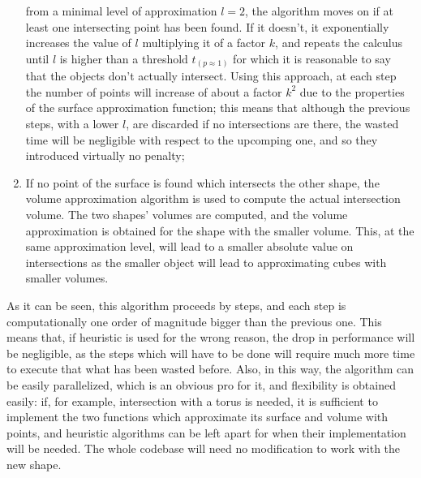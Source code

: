 \begin{enumerate}
{    from a minimal level of approximation  $l=2$, the algorithm moves
    on if at least one intersecting point has been found. If it
    doesn't, it exponentially increases the value of $l$ multiplying
    it of a factor $k$, and repeats
    the calculus until $l$ is higher than a threshold
    $t_{(p\approx 1)}$ for which it is reasonable to say that the
    objects don't actually intersect. Using this approach, at each
    step the number of points will increase of about a factor $k^2$
    due to the properties of the surface approximation function; this
    means that although the previous steps, with a lower $l$, are
    discarded if no intersections are there, the wasted time will be
    negligible with respect to the upcomping one, and so they introduced virtually no penalty;}
  \item{If no point of the surface is found which intersects the other
    shape, the volume approximation algorithm is used to compute the
    actual intersection volume. The two shapes' volumes are computed,
    and the volume approximation is obtained for the shape with the
    smaller volume. This, at the same approximation level, will lead
    to a smaller absolute value on intersections as the smaller object
    will lead to approximating cubes with smaller volumes.}
\end{enumerate}

As it can be seen, this algorithm proceeds by steps, and each step is
computationally one order of magnitude bigger than the previous
one. This means that, if heuristic is used for the wrong reason, the
drop in performance will be negligible, as the steps which will have
to be done will require much more time to execute that what has been
wasted before. Also, in this way, the algorithm can be easily
parallelized, which is an obvious pro for it, and flexibility is
obtained easily: if, for example, intersection with a torus is needed,
it is sufficient to implement the two functions which approximate its
surface and volume with points, and heuristic algorithms can be left
apart for when their implementation will be needed. The whole codebase
will need no modification to work with the new shape.

